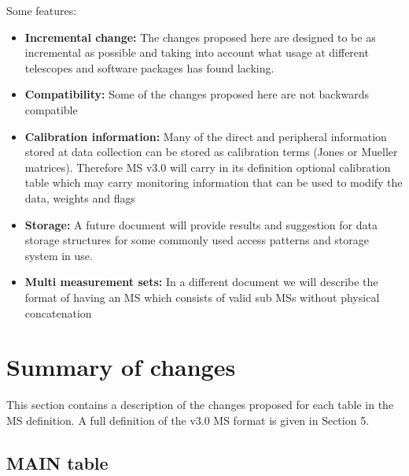 \documentclass{article}
\begin{document}
Some features:

\begin{itemize}

\item{{\bf Incremental change:} The changes proposed here are designed
to be as incremental as possible and taking into account what usage at different telescopes and software packages has found lacking.}

\item{{\bf Compatibility:} Some of the changes proposed here are not backwards compatible}

\item{{\bf Calibration information:} Many of the direct and peripheral information stored at data collection can be stored as calibration terms (Jones or Mueller matrices). Therefore MS v3.0 will carry in its definition optional calibration table which may carry monitoring information that can be used to modify the data, weights and flags }

\item{{\bf Storage:} A future document will provide results and suggestion for data storage structures for some commonly used access patterns and storage system in use.}

\item{{\bf Multi measurement sets:} In a different document we will
    describe the format of having an MS which consists of valid sub
    MSs without physical concatenation}


\end{itemize}


\section{Summary of changes}

This section contains a description of the changes proposed for each
table in the MS definition. A full definition of the v3.0 MS format is
given in Section 5.

\subsection{MAIN table}
\end{document}

